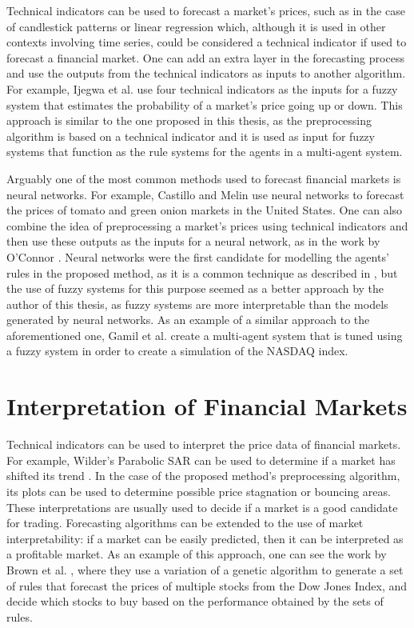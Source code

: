 Technical indicators can be used to forecast a market's prices, such as in the
case of candlestick patterns \cite{Nison1991} or linear regression
\cite{kutner2004applied} which, although it is used in other contexts involving
time series, could be considered a technical indicator if used to forecast a
financial market. One can add an extra layer in the forecasting process and use
the outputs from the technical indicators as inputs to another algorithm. For
example, Ijegwa et al. \cite{Ijegwa2014} use four technical indicators as the
inputs for a fuzzy system that estimates the probability of a market's price
going up or down. This approach is similar to the one proposed in this thesis,
as the preprocessing algorithm is based on a technical indicator and it is used
as input for fuzzy systems that function as the rule systems for the agents in a
multi-agent system.

Arguably one of the most common methods used to forecast financial markets is
neural networks. For example, Castillo and Melin \cite{Castillo2001}
\cite{melin2007hybrid} use neural networks to forecast the prices of tomato and
green onion markets in the United States. One can also combine the idea of
preprocessing a market's prices using technical indicators and then use these
outputs as the inputs for a neural network, as in the work by O'Connor
\cite{Connor2005}. Neural networks were the first candidate for modelling the
agents' rules in the proposed method, as it is a common technique as described
in \cite{Grothmann2002}, but the use of fuzzy systems for this purpose seemed as
a better approach by the author of this thesis, as fuzzy systems are more
interpretable than the models generated by neural networks. As an example of a
similar approach to the aforementioned one, Gamil et al. \cite{Gamil2007} create
a multi-agent system that is tuned using a fuzzy system in order to create a
simulation of the NASDAQ index.

\section{Interpretation of Financial Markets}
\label{section:interpretation-of-financial-markets}

Technical indicators can be used to interpret the price data of financial
markets. For example, Wilder's Parabolic SAR can be used to determine if a
market has shifted its trend \cite{Wilder1978}. In the case of the proposed
method's preprocessing algorithm, its plots can be used to determine possible
price stagnation or bouncing areas. These interpretations are usually used to
decide if a market is a good candidate for trading. Forecasting algorithms can
be extended to the use of market interpretability: if a market can be easily
predicted, then it can be interpreted as a profitable market. As an example of
this approach, one can see the work by Brown et al. \cite{Brown2013}, where
they use a variation of a genetic algorithm to generate a set of rules that
forecast the prices of multiple stocks from the Dow Jones Index, and decide
which stocks to buy based on the performance obtained by the sets of rules.


